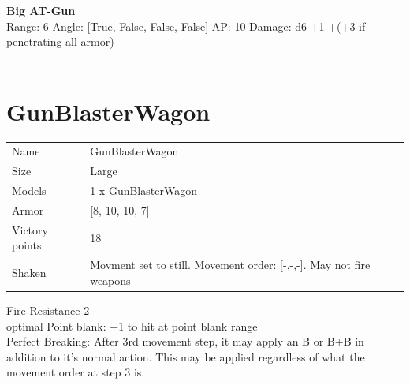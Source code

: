 \ \\

\ \\
{\bf Big AT-Gun } \\



Range: 6  Angle: [True, False, False, False] AP: 10 Damage: d6 +1 +(+3 if penetrating all armor) \\




 
\ \\














\clearpage

\section{ GunBlasterWagon }

\begin{tabular}{ll}
  Name & GunBlasterWagon \\
  Size & Large\\
  Models & 1 x GunBlasterWagon\\
  Armor & [8, 10, 10, 7]\\
  Victory points & 18\\
  Shaken & Movment set to still. Movement order: [-,-,-]. May not fire weapons\\
\end{tabular}

Fire Resistance 2\\ 
optimal Point blank: +1 to hit at point blank range\\ 
Perfect Breaking: After 3rd movement step, it may apply an B or B+B in addition to it's normal action. This may be applied regardless of what the movement order at step 3 is.\\ 



